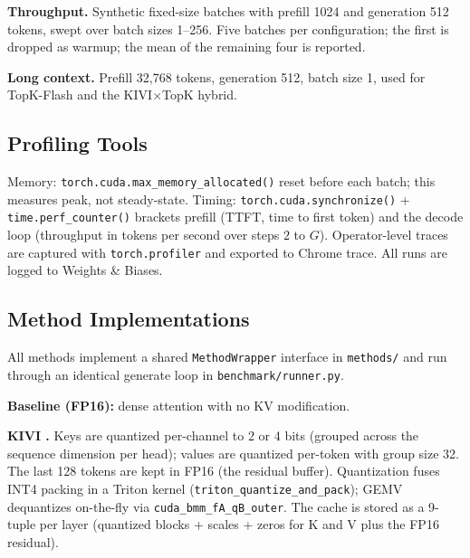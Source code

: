 \documentclass[conference]{IEEEtran}
\begin{document}
\textbf{Throughput.}  Synthetic fixed-size batches with prefill 1024
and generation 512 tokens, swept over batch sizes 1--256.  Five batches
per configuration; the first is dropped as warmup; the mean of the
remaining four is reported.

\textbf{Long context.}  Prefill 32{,}768 tokens, generation 512, batch
size 1, used for TopK-Flash and the KIVI$\times$TopK hybrid.

\subsection{Profiling Tools}

Memory: \texttt{torch.cuda.max\_memory\_allocated()} reset before each
batch; this measures peak, not steady-state.  Timing:
\texttt{torch.cuda.synchronize()} + \texttt{time.perf\_counter()}
brackets prefill (TTFT, time to first token) and the decode loop
(throughput in tokens per second over steps $2$ to $G$).
Operator-level traces are captured with \texttt{torch.profiler} and
exported to Chrome trace.  All runs are logged to Weights \& Biases.

\subsection{Method Implementations}

All methods implement a shared \texttt{MethodWrapper} interface in
\texttt{methods/} and run through an identical generate loop in
\texttt{benchmark/runner.py}.

\textbf{Baseline (FP16):} dense attention with no KV modification.

\textbf{KIVI \cite{kivi}.}  Keys are quantized per-channel to 2 or 4
bits (grouped across the sequence dimension per head); values are
quantized per-token with group size 32.  The last 128 tokens are kept
in FP16 (the residual buffer).  Quantization fuses INT4 packing in a
Triton kernel (\texttt{triton\_quantize\_and\_pack}); GEMV dequantizes
on-the-fly via \texttt{cuda\_bmm\_fA\_qB\_outer}.  The cache is stored
as a 9-tuple per layer (quantized blocks + scales + zeros for K and V
plus the FP16 residual).
\end{document}
